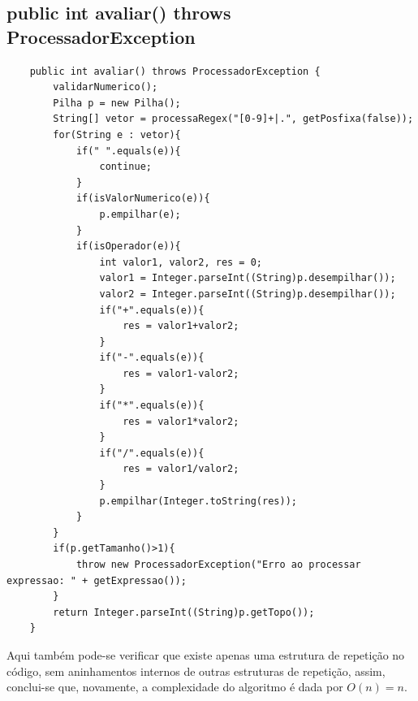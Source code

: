 \documentclass[a4paper,11pt]{article}
\begin{document}
\subsection{public int avaliar() throws ProcessadorException}
\begin{lstlisting}
    public int avaliar() throws ProcessadorException {
        validarNumerico();        
        Pilha p = new Pilha();
        String[] vetor = processaRegex("[0-9]+|.", getPosfixa(false));
        for(String e : vetor){
            if(" ".equals(e)){
                continue;
            }            
            if(isValorNumerico(e)){
                p.empilhar(e);
            }            
            if(isOperador(e)){
                int valor1, valor2, res = 0;
                valor1 = Integer.parseInt((String)p.desempilhar());
                valor2 = Integer.parseInt((String)p.desempilhar());
                if("+".equals(e)){
                    res = valor1+valor2;
                }                
                if("-".equals(e)){
                    res = valor1-valor2;
                }                
                if("*".equals(e)){
                    res = valor1*valor2;
                }                
                if("/".equals(e)){
                    res = valor1/valor2;
                }              
                p.empilhar(Integer.toString(res));
            }
        }
        if(p.getTamanho()>1){
            throw new ProcessadorException("Erro ao processar expressao: " + getExpressao());
        }
        return Integer.parseInt((String)p.getTopo());
    }
\end{lstlisting}
Aqui também pode-se verificar que existe apenas uma estrutura de repetição no código, sem aninhamentos internos de outras estruturas de repetição, assim, conclui-se que, novamente, a complexidade do algoritmo é dada por \(O(n)=n\).
\end{document}
